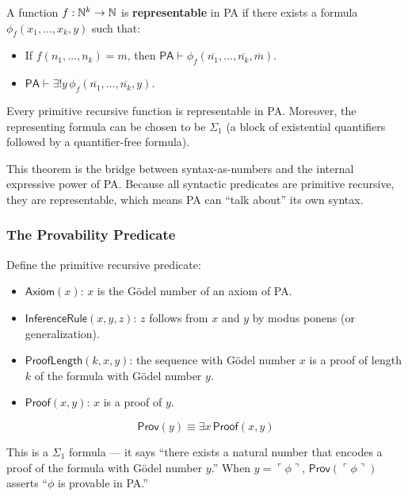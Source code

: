 \begin{definition}[Representability]
A function $f: \mathbb{N}^k \to \mathbb{N}$ is \textbf{representable} in PA if there exists a formula $\phi_f(x_1, \dots, x_k, y)$ such that:
\begin{itemize}
\item If $f(n_1, \dots, n_k) = m$, then $\mathsf{PA} \vdash \phi_f(\overline{n_1}, \dots, \overline{n_k}, \overline{m})$.
\item $\mathsf{PA} \vdash \exists! y\, \phi_f(\overline{n_1}, \dots, \overline{n_k}, y)$.
\end{itemize}
\end{definition}

\begin{theorem}
Every primitive recursive function is representable in PA. Moreover, the representing formula can be chosen to be $\Sigma_1$ (a block of existential quantifiers followed by a quantifier-free formula).
\end{theorem}

This theorem is the bridge between syntax-as-numbers and the internal expressive power of PA. Because all syntactic predicates are primitive recursive, they are representable, which means PA can ``talk about'' its own syntax.

\subsubsection*{The Provability Predicate}

Define the primitive recursive predicate:
\begin{itemize}
\item $\mathsf{Axiom}(x)$: $x$ is the Gödel number of an axiom of PA.
\item $\mathsf{InferenceRule}(x, y, z)$: $z$ follows from $x$ and $y$ by modus ponens (or generalization).
\item $\mathsf{ProofLength}(k, x, y)$: the sequence with Gödel number $x$ is a proof of length $k$ of the formula with Gödel number $y$.
\item $\mathsf{Proof}(x, y)$: $x$ is a proof of $y$.
\end{itemize}

\begin{definition}
\[
\mathsf{Prov}(y) \equiv \exists x\, \mathsf{Proof}(x, y)
\]
\end{definition}

This is a $\Sigma_1$ formula --- it says ``there exists a natural number that encodes a proof of the formula with Gödel number $y$.'' When $y = \ulcorner \phi \urcorner$, $\mathsf{Prov}(\ulcorner \phi \urcorner)$ asserts ``$\phi$ is provable in PA.''

